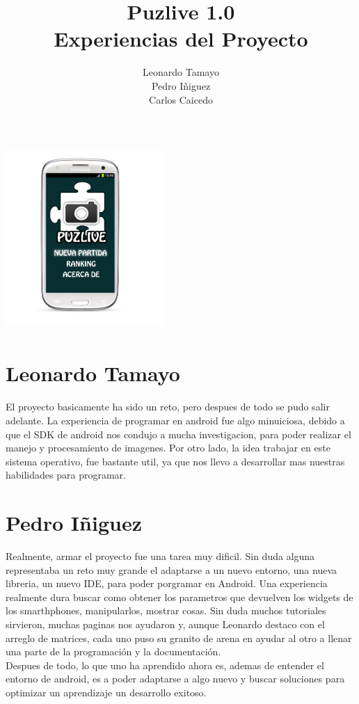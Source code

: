 \documentclass[10pt]{article}
\title{\bfseries\Huge Puzlive 1.0\\ Experiencias del Proyecto}
\author{Leonardo Tamayo \\Pedro Iñiguez \\Carlos Caicedo}
\date{}
\begin{document}
\begin{minipage}{0.65\textwidth}
\begingroup
\let\center\flushleft
\let\endcenter\endflushleft
\maketitle

\endgroup
\end{minipage}
\begin{minipage}{0.3\textwidth}

\includegraphics[height=7cm,width=6cm]{androidpro4.png}
\end{minipage}

\section{Leonardo Tamayo}

El proyecto basicamente ha sido un reto, pero despues de todo se pudo salir adelante. La experiencia de programar en android fue algo minuiciosa, debido a que el SDK de android nos condujo a mucha investigacion, para poder realizar el manejo y procesamiento de imagenes. Por otro lado, la idea trabajar en este sistema operativo, fue bastante util, ya que nos llevo a desarrollar mas nuestras habilidades para programar.
	
\section{Pedro Iñiguez}
Realmente, armar el proyecto fue una tarea muy dificil. Sin duda alguna representaba un reto muy grande el adaptarse a un nuevo entorno, una nueva libreria, un nuevo IDE, para
poder porgramar en Android. Una experiencia realmente dura buscar como obtener los parametros que devuelven los widgets de los smarthphones, manipularlos, mostrar cosas.
Sin duda muchos tutoriales sirvieron, muchas paginas nos ayudaron y, aunque Leonardo destaco con el arreglo de matrices, cada uno puso su granito de arena en ayudar al otro 
a llenar una parte de la programaci\'on y la documentaci\'on. \\Despues de todo, lo que uno ha aprendido ahora es, ademas de entender el entorno de android, es a poder adaptarse
a algo nuevo y buscar soluciones para optimizar un aprendizaje un desarrollo exitoso.
	
\end{document}
